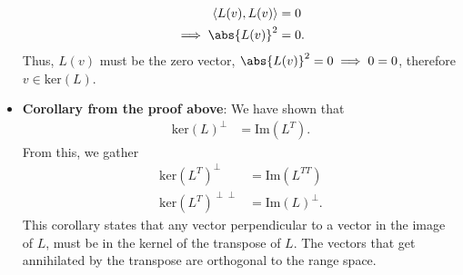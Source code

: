 \documentclass{report}
\begin{document}
\begin{itemize}
\begin{align*}
                \left\langle L(v), L(v) \right\rangle &= 0 \\
                \implies \abs{L(v)}^{2} &= 0
            .\end{align*}
            Thus, $L(v)$ must be the zero vector, $\abs{L(v)}^{2}  = 0 \implies 0= 0$, therefore $v\in \text{ker}(L)$.
        \item \textbf{Corollary from the proof above}: We have shown that 
            \begin{align*}
                \text{ker}(L)^{\perp} &= \text{Im}(L^{T})
            .\end{align*}
            From this, we gather
            \begin{align*}
                \text{ker}(L^{T})^{\perp} &= \text{Im}(L^{TT}) \\
                                          \text{ker}(L^{T})^{\perp\perp}&= \text{Im}(L)^{\perp}
            .\end{align*}
            \bigbreak \noindent 
            This corollary states that any vector perpendicular to a vector in the image of $L$, must be in the kernel of the transpose of $L$. The vectors that get annihilated by the transpose are orthogonal to the range space.



    \end{itemize}



    \pagebreak 
\end{document}
